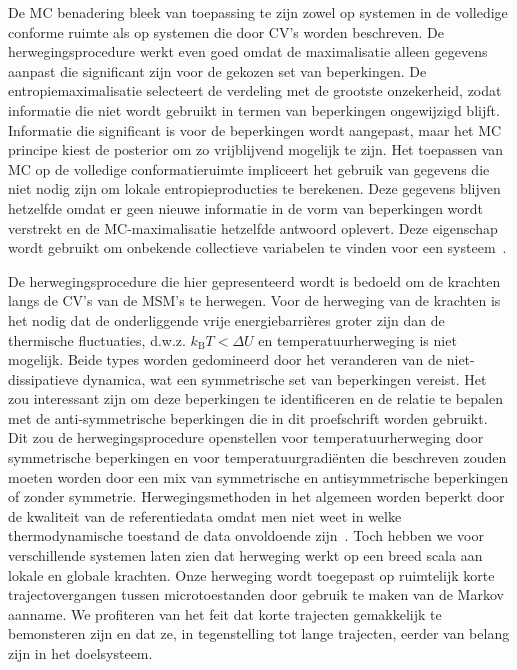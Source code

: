 De MC benadering bleek van toepassing te zijn zowel op systemen in de volledige conforme ruimte als op systemen die door CV's worden beschreven. De herwegingsprocedure werkt even goed omdat de maximalisatie alleen gegevens aanpast die significant zijn voor de gekozen set van beperkingen. De entropiemaximalisatie selecteert de verdeling met de grootste onzekerheid, zodat informatie die niet wordt gebruikt in termen van beperkingen ongewijzigd \mbox{blijft}. Informatie die significant is voor de beperkingen wordt aangepast, maar het MC principe kiest de posterior om zo \mbox{vrij}blijvend mogelijk te zijn. Het toepassen van MC op de volledige conformatieruimte impliceert het gebruik van gegevens die niet nodig zijn om lokale entropieproducties te berekenen. Deze gegevens blijven hetzelfde omdat er geen nieuwe informatie in de vorm van beperkingen wordt verstrekt en de MC-maximalisatie hetzelfde antwoord oplevert. Deze eigenschap wordt gebruikt om onbekende collectieve variabelen te vinden voor een systeem~\cite{smith2018multi, tiwary2016spectral}. 


De herwegingsprocedure die hier gepresenteerd wordt is bedoeld om de krachten langs de CV's van de MSM's te herwegen. Voor de herweging van de krachten is het nodig dat de onderliggende vrije energiebarrières groter zijn dan de thermische fluctuaties, d.w.z. $k_{\mathrm{B}} T < \Delta U$ en temperatuurherweging is niet mogelijk.  Beide types worden gedomineerd door het veranderen van de niet-dissipatieve dynamica, wat een symmetrische set van beperkingen vereist. Het zou interessant zijn om deze beperkingen te identificeren en de relatie te bepalen met de anti-symmetrische beperkingen die in dit proefschrift worden gebruikt. Dit zou de herwegingsprocedure openstellen voor temperatuurherweging door symmetrische beperkingen en voor temperatuurgradiënten die beschreven zouden moeten worden door een mix van symmetrische en antisymmetrische beperkingen of zonder symmetrie.  Herwegingsmethoden in het algemeen worden beperkt door de kwaliteit van de referentiedata omdat men niet weet in welke thermodynamische toestand de data onvoldoende zijn~\cite{warren2018trajectory}. Toch hebben we voor verschillende systemen laten zien dat herweging werkt op een breed scala aan lokale en globale krachten. Onze herweging wordt toegepast op ruimtelijk \mbox{korte} trajectovergangen tussen microtoestanden door gebruik te maken van de Markov aanname. We profiteren van het feit dat korte trajecten gemakkelijk te bemonsteren zijn en dat ze, in tegenstelling tot lange trajecten, eerder van belang zijn in het doelsysteem. 

